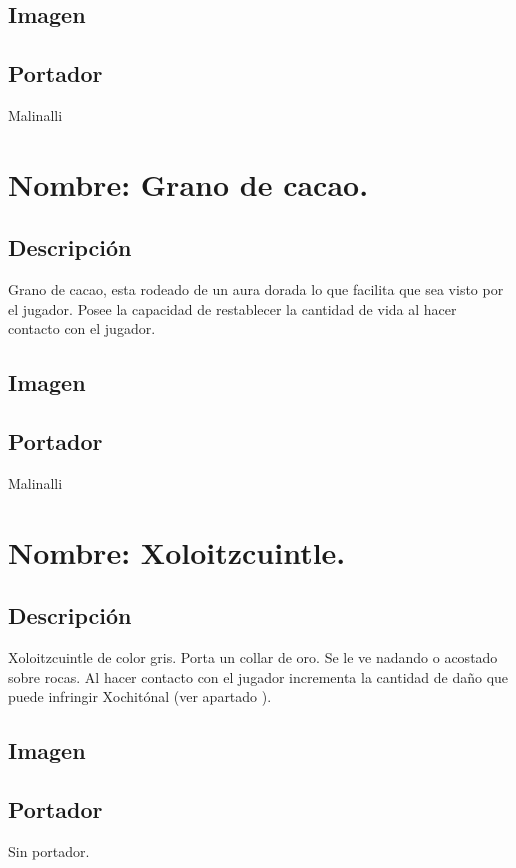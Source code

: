 	\subsection{Imagen}
	\subsection{Portador}
	Malinalli 

	\section{Nombre: Grano de cacao.}\label{item:cacao}
	\subsection{Descripción}
	Grano de cacao, esta rodeado de un aura dorada lo que facilita que sea visto por el jugador. Posee la capacidad de restablecer la cantidad de vida al hacer contacto con el jugador.
	\subsection{Imagen}
	\subsection{Portador}
	Malinalli 

	\section{Nombre: Xoloitzcuintle.}\label{item:Xolo}
	\subsection{Descripción}
Xoloitzcuintle de color gris. Porta un collar de oro. Se le ve nadando o acostado sobre rocas. Al hacer contacto con el jugador incrementa la cantidad de daño que puede infringir Xochitónal (ver apartado \label{Nivel:Niv02}).	
	\subsection{Imagen}
	\subsection{Portador}
	Sin portador. 


